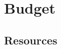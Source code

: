 \section{Budget}
\label{Management:Budget}

\subsection{Resources}
\label{Management:Budget:Resources}